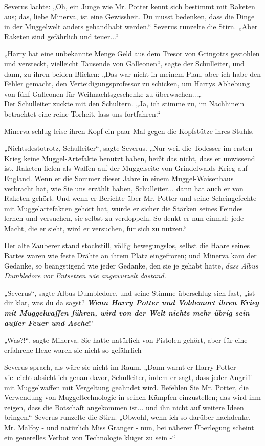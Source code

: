 {Severus lachte: „Oh, ein Junge wie Mr. Potter kennt sich bestimmt mit Raketen aus; das, liebe Minerva, ist eine Gewissheit. Du musst bedenken, dass die Dinge in der Muggelwelt anders gehandhabt werden.“ Severus runzelte die Stirn. „Aber Raketen sind gefährlich und teuer...“

„Harry hat eine unbekannte Menge Geld aus dem Tresor von Gringotts gestohlen und versteckt, vielleicht Tausende von Galleonen“, sagte der Schulleiter, und dann, zu ihren beiden Blicken: „Das war nicht in meinem Plan, aber ich habe den Fehler gemacht, den Verteidigungsprofessor zu schicken, um Harrys Abhebung von fünf Galleonen für Weihnachtsgeschenke zu überwachen...„\\ Der Schulleiter zuckte mit den Schultern. „Ja, ich stimme zu, im Nachhinein betrachtet eine reine Torheit, lass uns fortfahren.“

Minerva schlug leise ihren Kopf ein paar Mal gegen die Kopfstütze ihres Stuhls.

„Nichtsdestotrotz, Schulleiter“, sagte Severus. „Nur weil die Todesser im ersten Krieg keine Muggel-Artefakte benutzt haben, heißt das nicht, dass er unwissend ist. Raketen fielen als Waffen auf der Muggelseite von Grindelwalds Krieg auf England. Wenn er die Sommer dieser Jahre in einem Muggel-Waisenhaus verbracht hat, wie Sie uns erzählt haben, Schulleiter... dann hat auch er von Raketen gehört. Und wenn er Berichte über Mr. Potter und seine Scheingefechte mit Muggelartefakten gehört hat, würde er sicher die Stärken seines Feindes lernen und versuchen, sie selbst zu verdoppeln. So denkt er nun einmal; jede Macht, die er sieht, wird er versuchen, für sich zu nutzen.“

Der alte Zauberer stand stockstill, völlig bewegungslos, selbst die Haare seines Bartes waren wie feste Drähte an ihrem Platz eingefroren; und Minerva kam der Gedanke, so beängstigend wie jeder Gedanke, den sie je gehabt hatte, \emph{dass Albus Dumbledore vor Entsetzen wie angewurzelt dastand.}

„Severus“, sagte Albus Dumbledore, und seine Stimme überschlug sich fast, „ist dir klar, was du da sagst? \textbf{\emph{Wenn Harry Potter und Voldemort ihren Krieg mit Muggelwaffen führen, wird von der Welt nichts mehr übrig sein außer Feuer und Asche}!}"

„Was?!“, sagte Minerva. Sie hatte natürlich von Pistolen gehört, aber für eine erfahrene Hexe waren sie nicht so gefährlich -

Severus sprach, als wäre sie nicht im Raum. „Dann warnt er Harry Potter vielleicht absichtlich genau davor, Schulleiter, indem er sagt, dass jeder Angriff mit Muggelwaffen mit Vergeltung geahndet wird. Befehlen Sie Mr. Potter, die Verwendung von Muggeltechnologie in seinen Kämpfen einzustellen; das wird ihm zeigen, dass die Botschaft angekommen ist... und ihn nicht auf weitere Ideen bringen.“ Severus runzelte die Stirn. „Obwohl, wenn ich so darüber nachdenke, Mr. Malfoy - und natürlich Miss Granger - nun, bei näherer Überlegung scheint ein generelles Verbot von Technologie klüger zu sein -“

}
